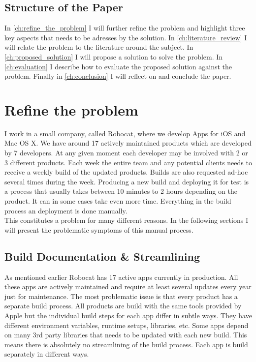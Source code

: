 \documentclass{ituthesis}
\begin{document}
\section{Structure of the Paper}

In \autoref{ch:refine_the_problem} I will further refine the problem and highlight three key aspects that needs to be adresses by the solution. In \autoref{ch:literature_review} I will relate the problem to the literature around the subject. In \autoref{ch:proposed_solution} I will propose a solution to solve the problem. In \autoref{ch:evaluation} I describe how to evaluate the proposed solution against the problem. Finally in \autoref{ch:conclusion} I will reflect on and conclude the paper.

\chapter{Refine the problem}
\label{ch:refine_the_problem}

I work in a small company, called Robocat, where we develop Apps for iOS and Mac OS X. We have around 17 actively maintained products which are developed by 7 developers. At any given moment each developer may be involved with 2 or 3 different products. Each week the entire team and any potential clients needs to receive a weekly build of the updated products. Builds are also requested ad-hoc several times during the week. Producing a new build and deploying it for test is a process that usually takes between 10 minutes to 2 hours depending on the product. It can in some cases take even more time. Everything in the build process an deployment is done manually.\\

This constitutes a problem for many different reasons. In the following sections I will present the problematic symptoms of this manual process.

\section{Build Documentation \& Streamlining}

As mentioned earlier Robocat has 17 active apps currently in production. All these apps are actively maintained and require at least several updates every year just for maintenance. The most problematic issue is that every product has a separate build process. All products are build with the same tools provided by Apple but the individual build steps for each app differ in subtle ways. They have different environment variables, runtime setups, libraries, etc. Some apps depend on many 3rd party libraries that needs to be updated with each new build. This means there is absolutely no streamlining of the build process. Each app is build separately in different ways. \\
\end{document}
